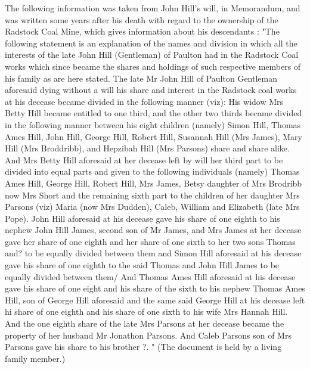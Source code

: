 The following information was taken from John Hill's will, in Memorandum, and was  written some years after his death with regard to the ownership of the Radstock Coal Mine, which gives information about his descendants : "The following statement is an explanation of the names and division in which all the interests of the late John Hill (Gentleman) of Paulton had in the Radstock Coal works which since became the shares and holdings of such respective members of his family as are here stated. The late Mr John Hill of Paulton Gentleman aforesaid dying without a will his share and interest in the Radstock coal works at his decease became divided in the following manner (viz): His widow Mrs Betty Hill became entitled to one third, and the other two thirds became divided in the following manner between his eight children (namely) Simon Hill, Thomas Ames Hill, John Hill, George Hill, Robert Hill, Susannah Hill (Mrs James), Mary Hill (Mrs Broddribb), and Hepzibah Hill (Mrs Parsons) share and share alike. And Mrs Betty Hill aforesaid at her decease left by will her third part to be divided into equal parts and given to the following individuals (namely) Thomas Ames Hill, George Hill, Robert Hill, Mrs James, Betsy daughter of Mrs Brodribb now Mrs Short and the remaining sixth part to the children of her daughter Mrs Parsons (viz) Maria (now Mrs Dudden), Caleb, William and Elizabeth (late Mrs Pope). John Hill aforesaid at his decease gave his share of one eighth to his nephew John Hill James, second son of Mr James, and Mrs James at her decease gave her share of one eighth and her share of one sixth to her two sons Thomas and? to be equally divided between them and Simon Hill aforesaid at his decease gave his share of one eighth to the said Thomas and John Hill James to be equally divided between them/ And Thomas Ames Hill aforesaid at his decease gave his share of one eight and his share of the sixth to his nephew Thomas Ames Hill, son of George Hill aforesaid and the same said George Hill at his decease left hi share of one eighth and his share of one sixth to his wife Mrs Hannah Hill. And the one eighth share of the late Mrs Parsons at her decease became the property of her husband Mr Jonathon Parsons. And Caleb Parsons son of Mrs Parsons gave his share to his brother ?. " (The document is held by a living family member.)


